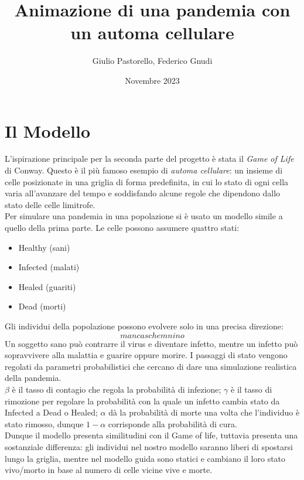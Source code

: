\documentclass{article}
\title{Animazione di una pandemia con un automa cellulare}
\author{Giulio Pastorello, Federico Gnudi}
\date{Novembre 2023}
\begin{document}
\maketitle

\section{Il Modello}

\hspace{\parindent}L'ispirazione principale per la seconda parte del progetto è 
stata il \textit{Game of Life} di Conway. Questo è il più famoso esempio di 
\textit{automa cellulare}: un insieme di celle posizionate in una griglia di forma 
predefinita, in cui lo stato di ogni cella varia all'avanzare del tempo e 
soddisfando alcune regole che dipendono dallo stato delle celle limitrofe. \\
Per simulare una pandemia  in una popolazione si è usato un modello simile a 
quello della prima parte. Le celle possono assumere quattro stati: 
\begin{itemize}
    \item Healthy (sani)
    \item Infected (malati)
    \item Healed (guariti)
    \item Dead (morti)
\end{itemize}
Gli individui della popolazione possono evolvere solo in una precisa direzione: \\
$$manca schemnino$$
Un soggetto sano può contrarre il virus e diventare infetto, mentre un infetto
può sopravvivere alla malattia e guarire oppure morire. I passaggi di stato 
vengono regolati da parametri probabilistici che cercano di dare una simulazione
realistica della pandemia. \\
$\beta$ è il tasso di contagio che regola la probabilità di infezione; $\gamma$ è 
il tasso di rimozione per regolare la probabilità con la quale un infetto cambia 
stato da Infected a Dead o Healed; $\alpha$ dà la probabilità di morte una volta 
che l'individuo è stato rimosso, dunque $1-\alpha$ corrisponde alla probabilità di 
cura. \\
Dunque il modello presenta similitudini con il Game of life, tuttavia presenta una 
sostanziale differenza: gli individui nel nostro modello saranno liberi di spostarsi 
lungo la griglia, mentre nel modello guida sono statici e cambiano il loro stato 
vivo/morto in base al numero di celle vicine vive e morte. 
\end{document}
